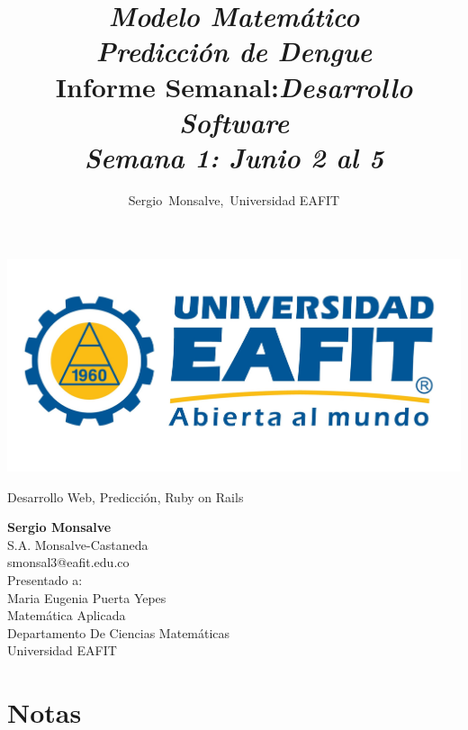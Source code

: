 \documentclass[12pt,journal,compsoc, onecolumn]{IEEEtran}
\author{Sergio~Monsalve,~Universidad EAFIT}
\title{ \textbf{\textit{Modelo Matemático\\ Predicción de Dengue}}\\
Informe Semanal:\em{Desarrollo Software}\\
Semana 1: Junio 2 al 5\\
}
\begin{document}
\pagestyle{fancyplain}
\fancyhf{}
\headheight=30pt %
\renewcommand{\headrulewidth}{0pt} %

\lhead %
{
\begin{minipage}{2cm}
\includegraphics[width=1.5 in]{Logo_EAFIT.jpg}
\end{minipage}
}

\fancyfoot[c]{\thepage}

\maketitle

\begin{IEEEkeywords}
Desarrollo Web, Predicción, Ruby on Rails
\end{IEEEkeywords}

 \newpage
 \newpage
 \newpage
 \newpage

\begin{center}
\begin{IEEEbiographynophoto}{}
\textbf{Sergio Monsalve}\\
S.A. Monsalve-Castaneda \\
smonsal3@eafit.edu.co\\

Presentado a:\\
Maria Eugenia Puerta Yepes\\[0.2cm]
Matemática Aplicada\\
Departamento De Ciencias Matemáticas\\
Universidad EAFIT
\end{IEEEbiographynophoto}
\end{center}





\appendix
\chapter{Notas}

\end{document}
